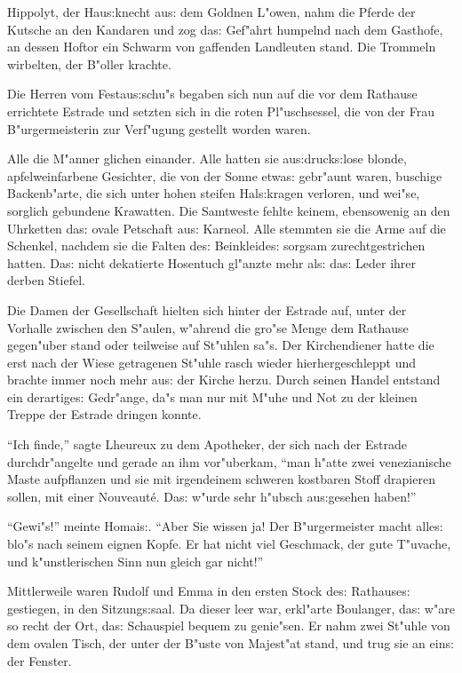 \documentclass[oneside,12pt]{book}
\newcommand{\s}{s:}%
\begin{document}
Hippolyt, der Hau{\s}knecht au{\s} dem Goldnen L"owen, nahm die
Pferde der Kutsche an den Kandaren und zog da{\s} Gef"ahrt
humpelnd nach dem Gasthofe, an dessen Hoftor ein Schwarm von
gaffenden Landleuten stand. Die Trommeln wirbelten, der B"oller
krachte.

Die Herren vom Festau{\s}schu"s begaben sich nun auf die vor dem
Rathause errichtete Estrade und setzten sich in die roten
Pl"uschsessel, die von der Frau B"urgermeisterin zur Verf"ugung
gestellt worden waren.

Alle die M"anner glichen einander. Alle hatten sie
au{\s}druck{\s}lose blonde, apfelweinfarbene Gesichter, die von
der Sonne etwa{\s} gebr"aunt waren, buschige Backenb"arte, die
sich unter hohen steifen Hal{\s}kragen verloren, und wei"se,
sorglich gebundene Krawatten. Die Samtweste fehlte keinem,
ebensowenig an den Uhrketten da{\s} ovale Petschaft au{\s}
Karneol. Alle stemmten sie die Arme auf die Schenkel, nachdem sie
die Falten de{\s} Beinkleide{\s} sorgsam zurechtgestrichen hatten.
Da{\s} nicht dekatierte Hosentuch gl"anzte mehr al{\s} da{\s}
Leder ihrer derben Stiefel.

Die Damen der Gesellschaft hielten sich hinter der Estrade auf,
unter der Vorhalle zwischen den S"aulen, w"ahrend die gro"se Menge
dem Rathause gegen"uber stand oder teilweise auf St"uhlen sa"s.
Der Kirchendiener hatte die erst nach der Wiese getragenen St"uhle
rasch wieder hierhergeschleppt und brachte immer noch mehr au{\s}
der Kirche herzu. Durch seinen Handel entstand ein derartige{\s}
Gedr"ange, da"s man nur mit M"uhe und Not zu der kleinen Treppe
der Estrade dringen konnte.

"`Ich finde,"' sagte Lheureux zu dem Apotheker, der sich nach der
Estrade durchdr"angelte und gerade an ihm vor"uberkam, "`man
h"atte zwei venezianische Maste aufpflanzen und sie mit
irgendeinem schweren kostbaren Stoff drapieren sollen, mit einer
Nouveaut\'e. Da{\s} w"urde sehr h"ubsch au{\s}gesehen haben!"'

"`Gewi"s!"' meinte Homai{\s}. "`Aber Sie wissen ja! Der
B"urgermeister macht alle{\s} blo"s nach seinem eignen Kopfe. Er
hat nicht viel Geschmack, der gute T"uvache, und k"unstlerischen
Sinn nun gleich gar nicht!"'

Mittlerweile waren Rudolf und Emma in den ersten Stock de{\s}
Rathause{\s} gestiegen, in den Sitzung{\s}saal. Da dieser leer
war, erkl"arte Boulanger, da{\s} w"are so recht der Ort, da{\s}
Schauspiel bequem zu genie"sen. Er nahm zwei St"uhle von dem
ovalen Tisch, der unter der B"uste von Majest"at stand, und trug
sie an ein{\s} der Fenster.
\end{document}
